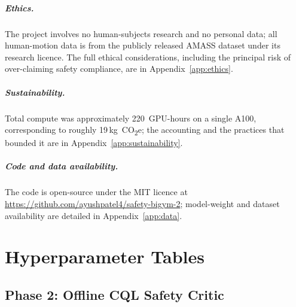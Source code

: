 \documentclass[11pt,a4paper]{report}
\begin{document}
\paragraph{Ethics.}
The project involves no human-subjects research and no personal
data; all human-motion data is from the publicly released AMASS
dataset under its research licence. The full ethical considerations,
including the principal risk of over-claiming safety compliance, are
in Appendix~\ref{app:ethics}.

\paragraph{Sustainability.}
Total compute was approximately 220~GPU-hours on a single A100,
corresponding to roughly 19\,kg~CO\textsubscript{2}e; the accounting
and the practices that bounded it are in
Appendix~\ref{app:sustainability}.

\paragraph{Code and data availability.}
The code is open-source under the MIT licence at
\url{https://github.com/ayushpatel4/safety-bigym-2}; model-weight and
dataset availability are detailed in Appendix~\ref{app:data}.

\clearpage
{}
{}


\appendix

\chapter{Hyperparameter Tables}
\label{app:hparams}

\section{Phase 2: Offline CQL Safety Critic}
\label{app:hparams:svf}
\end{document}
